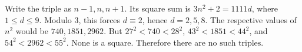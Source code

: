 Write the triple as $ n-1,n,n+1 $. Its square sum is $ 3n^2+2=1111d $, where $ 1\le d\le9 $. Modulo $ 3 $, this forces $ d\equiv2 $, hence $ d=2,5,8 $. The respective values of $ n^2 $ would be $ 740,1851,2962 $. But $ 27^2<740<28^2 $, $ 43^2<1851<44^2 $, and $ 54^2<2962<55^2 $. None is a square. Therefore there are $\boxed{\text{no such triples}}$.
